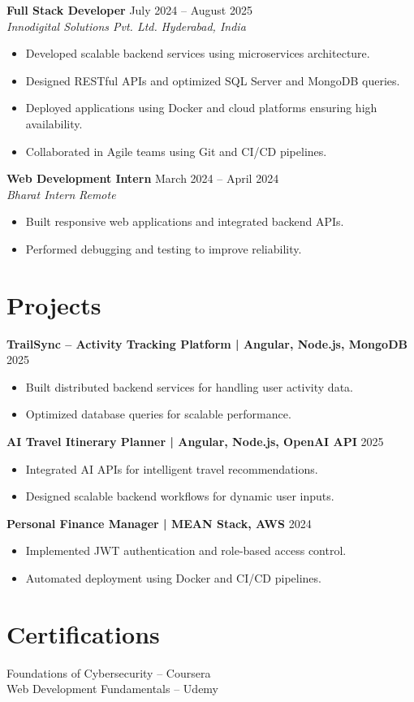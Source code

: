 \documentclass[letterpaper,10.5pt]{article}
\newcommand{\resumeItem}[1]{\item \small{#1}}
\newcommand{\resumeSubheading}[4]{
  \vspace{-2pt}
  \textbf{#1} \hfill #2 \\
  \textit{\small #3} \hfill \textit{\small #4}
}
\newcommand{\resumeProject}[2]{
  \vspace{-2pt}
  \textbf{#1} \hfill #2
}
\begin{document}
\resumeSubheading
{Full Stack Developer}{July 2024 -- August 2025}
{Innodigital Solutions Pvt. Ltd.}{Hyderabad, India}

\begin{itemize}[leftmargin=0.18in, itemsep=1pt, topsep=2pt]
\resumeItem{Developed scalable backend services using microservices architecture.}
\resumeItem{Designed RESTful APIs and optimized SQL Server and MongoDB queries.}
\resumeItem{Deployed applications using Docker and cloud platforms ensuring high availability.}
\resumeItem{Collaborated in Agile teams using Git and CI/CD pipelines.}
\end{itemize}

\resumeSubheading
{Web Development Intern}{March 2024 -- April 2024}
{Bharat Intern}{Remote}

\begin{itemize}[leftmargin=0.18in, itemsep=1pt, topsep=2pt]
\resumeItem{Built responsive web applications and integrated backend APIs.}
\resumeItem{Performed debugging and testing to improve reliability.}
\end{itemize}

\section*{Projects}

\resumeProject
{TrailSync -- Activity Tracking Platform | Angular, Node.js, MongoDB}{2025}
\begin{itemize}[leftmargin=0.18in, itemsep=1pt, topsep=2pt]
\resumeItem{Built distributed backend services for handling user activity data.}
\resumeItem{Optimized database queries for scalable performance.}
\end{itemize}

\resumeProject
{AI Travel Itinerary Planner | Angular, Node.js, OpenAI API}{2025}
\begin{itemize}[leftmargin=0.18in, itemsep=1pt, topsep=2pt]
\resumeItem{Integrated AI APIs for intelligent travel recommendations.}
\resumeItem{Designed scalable backend workflows for dynamic user inputs.}
\end{itemize}

\resumeProject
{Personal Finance Manager | MEAN Stack, AWS}{2024}
\begin{itemize}[leftmargin=0.18in, itemsep=1pt, topsep=2pt]
\resumeItem{Implemented JWT authentication and role-based access control.}
\resumeItem{Automated deployment using Docker and CI/CD pipelines.}
\end{itemize}

\section*{Certifications}
\small{
Foundations of Cybersecurity -- Coursera \\
Web Development Fundamentals -- Udemy
}
\end{document}

